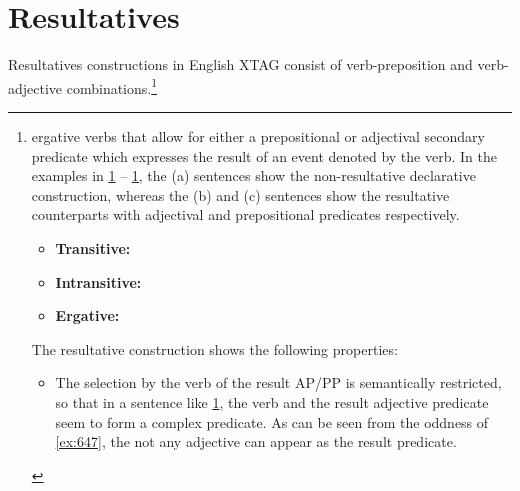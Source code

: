 \chapter{Resultatives} 
\label{result_clauses} 
 
Resultatives constructions in English XTAG consist of verb-preposition and 
verb-adjective combinations.\footnote{%
ergative verbs that allow for either a prepositional or adjectival 
secondary predicate which expresses the result of an event denoted by the 
verb. In the examples in \ref{ex:637} -- \ref{ex:639}, the (a) sentences show the 
non-resultative declarative construction, whereas the (b) and (c) sentences 
show the resultative counterparts with adjectival and prepositional 
predicates respectively. 
 
\begin{itemize} 
\item {\bf Transitive:} 
\beginsentences
{}\label{ex:637} 
\label{ex:638} 
\label{ex:639} 
\endsentences

 
\item {\bf Intransitive:} 
 
\beginsentences
{}\label{ex:640} 
\label{ex:641} 
\label{ex:642} 
\endsentences

 
\item {\bf Ergative:} 
\beginsentences
{}\label{ex:643} 
\label{ex:644} 
\label{ex:645} 
\endsentences

 
\end{itemize} 
 
The resultative construction shows the following properties:  
 
\begin{itemize} 
 
\item The selection by the verb of the result AP/PP is semantically 
restricted, so that in a sentence like \ref{ex:638}, the verb and the result 
adjective predicate seem to form a complex predicate. As can be seen from 
the oddness of \ref{ex:647}, the not any adjective can appear as the result 
predicate. 
 

\end{itemize}}
